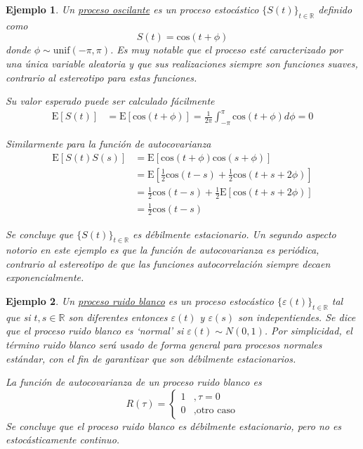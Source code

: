 \documentclass[12pt,letterpaper]{book}
\newtheorem{ejemplo}{Ejemplo}[chapter]
\newcommand{\R}{\mathbb{R}}
\newcommand{\COS}[1]{\mathrm{cos}\left( #1 \right)}
\newcommand{\E}[1]{\mathrm{E}\left[ #1 \right]}
\begin{document}
\begin{ejemplo}
Un \underline{proceso oscilante} es un proceso estocástico $\{ S(t)\}_{t\in\R}$ definido como
\begin{equation}
S(t) = \COS{t + \phi}
\end{equation}
donde $\phi \sim \text{unif}(-\pi,\pi)$.
%
Es muy notable que el proceso esté \textit{caracterizado} por una única variable aleatoria y que sus realizaciones siempre son funciones \textit{suaves}, contrario al estereotipo para estas funciones.

Su valor esperado puede ser calculado fácilmente
\begin{align}
\E{S(t)} &= \E{\COS{t + \phi}} = \frac{1}{2 \pi} \int_{-\pi}^\pi \COS{t + \phi} d\phi = 0
\end{align}

Similarmente para la función de autocovarianza
\begin{align}
\E{S(t)S(s)} &= 
\E{\COS{t + \phi}\COS{s + \phi}} \nonumber \\
&=
\E{\frac{1}{2} \COS{t-s} + \frac{1}{2}\COS{t+s+2\phi}} \nonumber \\
&=
\frac{1}{2} \COS{t-s} + \frac{1}{2} \E{\COS{t+s+2\phi}} \nonumber \\
&= \frac{1}{2} \COS{t-s}
\end{align}

Se concluye que $\{ S(t)\}_{t\in\R}$ es débilmente estacionario.
%
Un segundo aspecto notorio en este ejemplo es que la función de autocovarianza es periódica, contrario al estereotipo de que las funciones autocorrelación siempre decaen exponencialmente.
\end{ejemplo}

\begin{ejemplo}
Un \underline{proceso ruido blanco} es un proceso estocástico $\{ \varepsilon(t)\}_{t\in\R}$ tal que si $t, s\in \R$ son diferentes entonces $\varepsilon(t)$ y $\varepsilon(s)$ son indepentiendes.
%
Se dice que el proceso ruido blanco es `normal' si $\varepsilon(t) \sim N(0,1)$.
%
Por simplicidad, el término ruido blanco será usado de forma general para procesos normales estándar, con el fin de garantizar que son débilmente estacionarios.

La función de autocovarianza de un proceso ruido blanco es
\begin{equation}
R(\tau) = \begin{cases}
1 &, \tau = 0 \\
0 &, \text{otro caso}
\end{cases}
\end{equation}
Se concluye que el proceso ruido blanco es débilmente estacionario, pero no es estocásticamente continuo.
\end{ejemplo}
\end{document}
